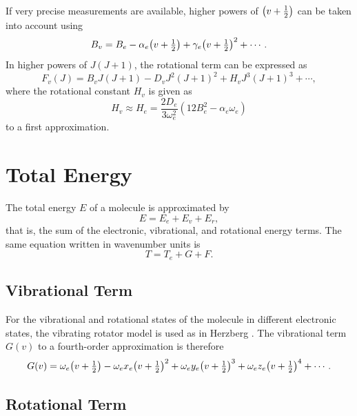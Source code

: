 \documentclass[11pt, twoside, fleqn]{report}
\DeclarePairedDelimiter\p{\lparen}{\rparen}
\begin{document}
If very precise measurements are available, higher powers of $\p*{v + \tfrac{1}{2}}$ can be taken into account using
\begin{equation*}
    B_v = B_e - \alpha_e\p*{v + \tfrac{1}{2}} + \gamma_e\p*{v + \tfrac{1}{2}}^2 + \dotsb.
\end{equation*}
In higher powers of $J(J + 1)$, the rotational term can be expressed as
\begin{equation*}
    F_v(J) = B_vJ(J + 1) - D_vJ^2(J + 1)^2 + H_vJ^3(J + 1)^3 + \dotsb,
\end{equation*}
where the rotational constant $H_v$ is given as
\begin{equation*}
    H_v \approx H_e = \frac{2D_e}{3\omega_e^2}(12B_e^2 - \alpha_e\omega_e)
\end{equation*}
to a first approximation.

\chapter{Total Energy}
\label{c:total_energy}

The total energy $E$ of a molecule is approximated by
\begin{equation*}
    E = E_e + E_v + E_r,
\end{equation*}
that is, the sum of the electronic, vibrational, and rotational energy terms. The same equation written in wavenumber units is
\begin{equation}
    T = T_e + G + F.
\end{equation}

\section{Vibrational Term}
\label{s:vibrational_term}

For the vibrational and rotational states of the molecule in different electronic states, the vibrating rotator model is used as in Herzberg \cite{herzberg:spectra}. The vibrational term $G(v)$ to a fourth-order approximation is therefore
\begin{equation}
    G(v) = \omega_e\p*{v + \tfrac{1}{2}} - \omega_ex_e\p*{v + \tfrac{1}{2}}^2 + \omega_ey_e\p*{v + \tfrac{1}{2}}^3 + \omega_ez_e\p*{v + \tfrac{1}{2}}^4 + \dotsb.
\end{equation}

\section{Rotational Term}
\label{s:rotational_term}
\end{document}
